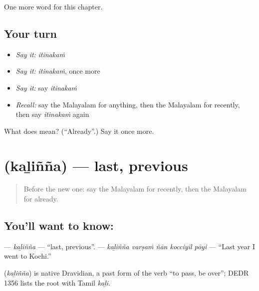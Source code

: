 \begin{grammarlens}[title={What you've built}]
One more word for this chapter.
\end{grammarlens}

\subsection*{Your turn}
\begin{itemize}
\raggedright
  \item \emph{Say it:} \emph{itinakaṁ}
  \item \emph{Say it:} \emph{itinakaṁ}, once more
  \item \emph{Say it:} say \emph{itinakaṁ}
  \item \emph{Recall:} say the Malayalam for anything, then the Malayalam for recently, then say \emph{itinakaṁ} again
\end{itemize}

\begin{tcolorbox}[breakable,colback=teal!4,colframe=teal!35!black,title={Before you move on}]
What does  mean? (\textquotedblleft{}Already\textquotedblright{}.) Say it once more.
\end{tcolorbox}
\section[\texorpdfstring{\ml{കഴിഞ്ഞ} (kaḻiñña)}{കഴിഞ്ഞ (kaḻiñña)}]{ (kaḻiñña) — last, previous}

\label{lesson:ML-C178-kazhinja}



\begin{quote}
Before the new one: say the Malayalam for recently, then the Malayalam for already.
\end{quote}

\subsection*{You'll want to know: }
\textbf{} — \emph{kaḻiñña} — \textquotedblleft{}last, previous\textquotedblright{}. \textbf{    } — \emph{kaḻiñña varṣaṁ ñān kocciyil pōyi} — \textquotedblleft{}Last year I went to Kochi.\textquotedblright{}

\begin{cousinweb}
\textbf{} (\emph{kaḻiñña}) is native Dravidian, a past form of the verb \textquotedblleft{}to pass, be over\textquotedblright{}; DEDR 1356 lists the root with Tamil \emph{kaḻi}.
\end{cousinweb}

